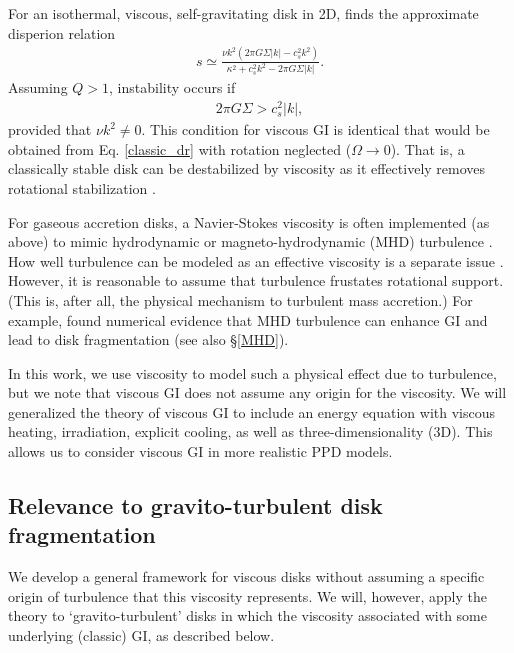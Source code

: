 \documentclass[iop, numberedappendix]{emulateapj}
\begin{document}
For an isothermal, viscous, self-gravitating disk in 2D,
\cite{gammie96} finds the approximate disperion relation   
\begin{align}
s \simeq \frac{\nu k^2\left(2\pi G\Sigma |k| -
  c_s^2k^2\right)}{\kappa^2 + c_s^2k^2 - 2\pi G\Sigma|k|}. 
\end{align}
Assuming $Q>1$, instability occurs if 
\begin{align*}
  2\pi G \Sigma > c_s^2|k|,
\end{align*}
provided that $\nu k^2\neq0$. This condition for viscous GI is 
identical that would be obtained from Eq. \ref{classic_dr} with
rotation neglected ($\Omega\to 0$). That is, a classically stable
disk can be destabilized by viscosity as it effectively removes
rotational stabilization \citep{lynden-bell74}.  

For gaseous accretion disks, a Navier-Stokes viscosity is often
implemented (as above) to mimic hydrodynamic or magneto-hydrodynamic
(MHD) turbulence \citep{shakura73}. How well turbulence can be modeled
as an effective viscosity is a separate issue 
\citep{balbus99}. However, it is reasonable to assume that turbulence
frustates rotational support. (This is, after all, the physical
mechanism to turbulent mass accretion.) 
For example, \cite{fromang05} found numerical evidence that MHD
turbulence can enhance GI and lead to disk fragmentation (see also
\S\ref{MHD}). 

In this work, we use viscosity to model such a 
physical effect due to turbulence, but we note that viscous 
GI does not assume any origin for the viscosity. We will generalized
the theory of viscous GI to include an energy equation  with viscous
heating, irradiation, explicit cooling, as well as
three-dimensionality (3D). This 
allows us to consider viscous GI in more realistic PPD models. 



\subsection{Relevance to gravito-turbulent disk fragmentation}
We develop a general framework for viscous disks without  
assuming a specific origin of turbulence that this viscosity 
represents. We will, however, apply the theory to `gravito-turbulent'
disks in which the viscosity associated with some underlying (classic)
GI, as described below.  
\end{document}
